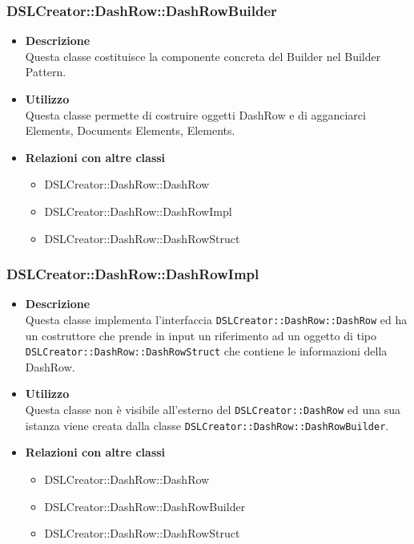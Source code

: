                 \subsubsection{DSLCreator::DashRow::DashRowBuilder}
                    \begin{itemize}
                        \item \textbf{Descrizione} \hfill \\
                            Questa classe costituisce la componente concreta del Builder nel Builder Pattern.
                        \item \textbf{Utilizzo} \hfill \\
                            Questa classe permette di costruire oggetti DashRow e di agganciarci  Elements, Documents Elements,  Elements.
                        \item \textbf{Relazioni con altre classi}
                            \begin{itemize}
                              \item DSLCreator::DashRow::DashRow
                              \item DSLCreator::DashRow::DashRowImpl
                              \item DSLCreator::DashRow::DashRowStruct
                            \end{itemize}
                    \end{itemize}

 \subsubsection{DSLCreator::DashRow::DashRowImpl}
                    \begin{itemize}
                        \item \textbf{Descrizione} \hfill \\
                            Questa classe implementa l'interfaccia \texttt{DSLCreator::DashRow::DashRow} ed ha un costruttore che prende in input un riferimento ad un oggetto di tipo \texttt{DSLCreator::Dash\-Row::DashRowStruct} che contiene le informazioni della DashRow.
                        \item \textbf{Utilizzo} \hfill \\
                            Questa classe non è visibile all'esterno del  \texttt{DSLCreator::DashRow} ed una sua istanza viene creata dalla classe \texttt{DSLCreator::DashRow::DashRowBuilder}.
                        \item \textbf{Relazioni con altre classi}
                            \begin{itemize}
                              \item DSLCreator::DashRow::DashRow
                              \item DSLCreator::DashRow::DashRowBuilder
                              \item DSLCreator::DashRow::DashRowStruct
                            \end{itemize}
                    \end{itemize}


